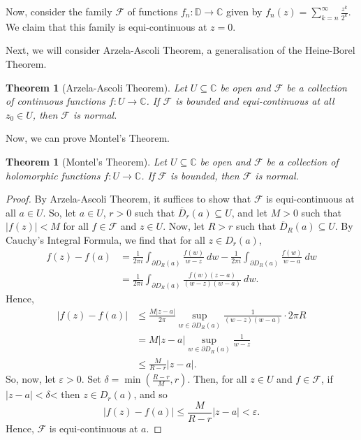 \documentclass[a4paper, openany]{memoir}
\theoremstyle{definition}
\theoremstyle{plain}
\newtheorem{theorem}[definition]{Theorem}
\begin{document}
    Now, consider the family $\mathcal{F}$ of functions $f_n \colon \mathbb{D} \to \mathbb{C}$ given by $f_n(z) = \sum_{k=n}^\infty \frac{z^k}{2^k}$. We claim that this family is equi-continuous at $z = 0$.

    Next, we will consider Arzela-Ascoli Theorem, a generalisation of the Heine-Borel Theorem.
    \begin{theorem}[Arzela-Ascoli Theorem]
        Let $U \subseteq \mathbb{C}$ be open and $\mathcal{F}$ be a collection of continuous functions $f \colon U \to \mathbb{C}$. If $\mathcal{F}$ is bounded and equi-continuous at all $z_0 \in U$, then $\mathcal{F}$ is normal.
    \end{theorem}
    \noindent Now, we can prove Montel's Theorem.
    \begin{theorem}[Montel's Theorem]
        Let $U \subseteq \mathbb{C}$ be open and $\mathcal{F}$ be a collection of holomorphic functions $f \colon U \to \mathbb{C}$. If $\mathcal{F}$ is bounded, then $\mathcal{F}$ is normal.
    \end{theorem}
    \begin{proof}
        By Arzela-Ascoli Theorem, it suffices to show that $\mathcal{F}$ is equi-continuous at all $a \in U$. So, let $a \in U$, $r > 0$ such that $\overline{D}_r(a) \subseteq U$, and let $M > 0$ such that $|f(z)| < M$ for all $f \in \mathcal{F}$ and $z \in U$. Now, let $R > r$ such that $\overline{D}_R(a) \subseteq U$. By Cauchy's Integral Formula, we find that for all $z \in D_r(a)$,
        \begin{align*}
            f(z) - f(a) &= \frac{1}{2\pi i} \int_{\partial D_R(a)} \frac{f(w)}{w - z} \ dw - \frac{1}{2\pi i} \int_{\partial D_R(a)} \frac{f(w)}{w - a} \ dw\\
            &= \frac{1}{2\pi i} \int_{\partial D_R(a)} \frac{f(w) (z - a)}{(w - z) (w - a)} \ dw.
        \end{align*}
        Hence, 
        \begin{align*}
            |f(z) - f(a)| &\leq \frac{M |z - a|}{2\pi} \sup_{w \in \partial D_R(a)} \frac{1}{(w - z)(w - a)} \cdot 2\pi R \\
            &= M|z - a| \sup_{w \in \partial D_R(a)} \frac{1}{w - z} \\
            &\leq \frac{M}{R - r} |z - a|.
        \end{align*}
        So, now, let $\varepsilon > 0$. Set $\delta = \min (\frac{R - r}{M}, r)$. Then, for all $z \in U$ and $f \in \mathcal{F}$, if $|z - a| < \delta$< then $z \in D_r(a)$, and so
        \[|f(z) - f(a)| \leq \frac{M}{R - r} |z - a| < \varepsilon.\]
        Hence, $\mathcal{F}$ is equi-continuous at $a$.
    \end{proof}
\end{document}
